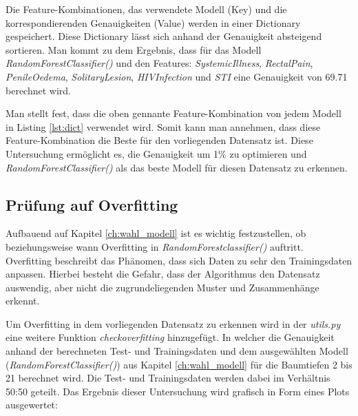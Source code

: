 \documentclass[13pt,a4paper, listof=entryprefix, bibliography=totocnumbered,toc=listofnumbered,lof=listofnumbered]{scrartcl}
\begin{document}
Die Feature-Kombinationen, das verwendete Modell (Key) und die korrespondierenden Genauigkeiten (Value) werden in 
einer Dictionary gespeichert. Diese Dictionary lässt sich anhand der Genauigkeit absteigend sortieren. Man kommt zu dem Ergebnis, dass für das Modell \textit{RandomForestClassifier()} und 
den Features: \textit{Systemic\textunderscore  Illness}, \textit{Rectal\textunderscore Pain}, \textit{Penile\textunderscore Oedema}, \textit{Solitary\textunderscore Lesion}, \textit{HIV\textunderscore Infection} und \textit{STI} 
eine Genauigkeit von 69.71 berechnet wird.  

	


Man stellt fest, dass die oben gennante Feature-Kombination von jedem Modell in Listing \ref{lst:dict} verwendet wird. Somit kann man annehmen, dass diese
Feature-Kombination die Beste für den vorliegenden Datensatz ist. Diese Untersuchung ermöglicht es, die Genauigkeit um 1\% zu optimieren und \textit{RandomForestClassifier()} als das beste Modell für
diesen Datensatz zu erkennen.  

	\subsection{Prüfung auf Overfitting}
		\label{ch:pruefung_overfitting}

Aufbauend auf Kapitel \ref{ch:wahl_modell} ist es wichtig festzustellen, ob beziehungsweise wann Overfitting in \textit{RandomForestclassifier()} auftritt. Overfitting beschreibt das Phänomen, dass
sich Daten zu sehr den Trainingsdaten anpassen. Hierbei besteht die Gefahr, dass der Algorithmus den Datensatz auswendig, aber nicht die zugrundeliegenden Muster und Zusammenhänge erkennt.

Um Overfitting in dem vorliegenden Datensatz zu erkennen wird in der \textit{utils.py} eine weitere Funktion \textit{check\textunderscore over\textunderscore fitting} hinzugefügt. In welcher
die Genauigkeit anhand der berechneten Test- und Trainingsdaten und dem ausgewählten Modell (\textit{RandomForestClassifier()}) aus 
Kapitel \ref{ch:wahl_modell} für die Baumtiefen 2 bis 21 berechnet wird. Die Test- und Trainingsdaten werden dabei im Verhältnis 50:50 geteilt. 
Das Ergebnis dieser Untersuchung wird grafisch in Form eines Plots ausgewertet: 
\end{document}
